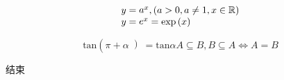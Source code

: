 \documentclass{article}%
\begin{document}
%
\normalsize%
%
$$\begin{array}{l l}{y=\mathop{{a}}\nolimits^{{x}},{ \left( {a > 0,a \neq 1,x \in  \mathbb{R} } \right) }}\\{y=\mathop{{e}}\nolimits^{{x}}={ \text{exp}  \left( {x} \right) }}\end{array}$$

$$\text {tan}{  \left ({  \pi +  \alpha }  \left )=  \text {tan}   \alpha   \right .  \right .}A  \subseteq B,B  \subseteq A  \Leftrightarrow A=B$$

结束
\end{document}
